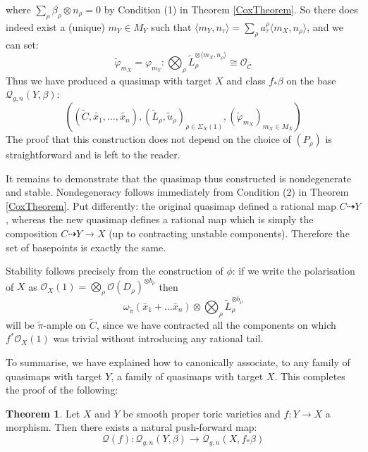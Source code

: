\documentclass[11pt]{amsart}
\newcommand{\Q}[4]{\mathcal{Q}_{#1,#2}(#3,#4)}
\newcommand{\OO}{\mathcal{O}}
\renewcommand{\to}{\rightarrow}
\newcommand{\om}[1]{\mathcal{#1}}
\theoremstyle{definition}
\newtheorem{thm}{Theorem}[section]
\theoremstyle{definition}
\begin{document}
where $\sum_\rho \beta_\rho \otimes n_\rho = 0$ by Condition (1) in Theorem \ref{CoxTheorem}. So there does indeed exist a (unique) $m_Y \in M_Y$ such that $\langle m_Y, n_\tau \rangle = \sum_\rho a_\tau^\rho \langle m_X, n_\rho \rangle$, and we can set:
\begin{equation*} \tilde{\varphi}_{m_X} = \varphi_{m_Y} : \bigotimes_\rho \tilde{L}_\rho^{\otimes \langle m_X, n_\rho \rangle} \cong \OO_{\overline{\mathcal C}} \end{equation*}
Thus we have produced a quasimap with target $X$ and class $f_*\beta$ on the base $\Q{g}{n}{Y}{\beta}$:
\begin{equation*} ((\tilde{C},\tilde{x_1},\ldots,\tilde{x_n}), (\tilde{L}_\rho, \tilde{u}_\rho)_{\rho \in \Sigma_X(1)}, (\tilde{\varphi}_{m_X})_{m_X \in M_X}) \end{equation*}
The proof that this construction does not depend on the choice of $(P_\rho)$ is straightforward and is left to the reader.

It remains to demonstrate that the quasimap thus constructed is nondegenerate and stable. Nondegeneracy follows immediately from Condition (2) in Theorem \ref{CoxTheorem}. Put differently: the original quasimap defined a rational map $C \dashrightarrow Y$, whereas the new quasimap defines a rational map which is simply the composition $C \dashrightarrow Y \to X$ (up to contracting unstable components). Therefore the set of basepoints is exactly the same.

Stability follows precisely from the construction of $\phi$: if we write the polarisation of $X$ as $\OO_X(1) = \bigotimes_\rho \OO(D_\rho)^{\otimes b_\rho}$ then 
\begin{equation*} \omega_{\tilde{\pi}}(\bar x_1+\ldots \bar x_n)\otimes\bigotimes_\rho \tilde{L}_\rho^{\otimes b_\rho} \end{equation*}
will be $\tilde\pi$-ample on $\tilde{C}$, since we have contracted all the components on which $f^*\OO_X(1)$ was trivial without introducing any rational tail.

To summarise, we have explained how to canonically associate, to any family of quasimaps with target $Y$, a family of quasimaps with target $X$. This completes the proof of the following:

\begin{thm} \label{functoriality proposition} Let $X$ and $Y$ be smooth proper toric varieties and $f : Y \to X$ a morphism. Then there exists a natural push-forward map:
\begin{equation*} \om{Q}(f) \colon \Q{g}{n}{Y}{\beta} \to \Q{g}{n}{X}{f_* \beta} \end{equation*}\end{thm}
 	
\end{document}
